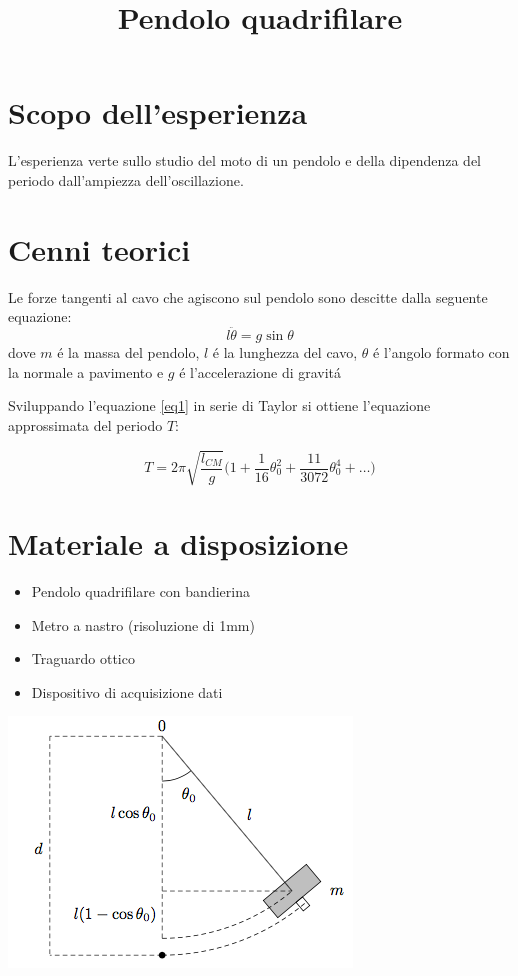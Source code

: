 \documentclass{article}
\begin{document}
\title{Pendolo quadrifilare}
\maketitle
\section{Scopo dell'esperienza}
L'esperienza verte sullo studio del moto di un pendolo e della dipendenza del periodo dall'ampiezza dell'oscillazione.
\section{Cenni teorici}
Le forze tangenti al cavo che agiscono sul pendolo sono descitte dalla seguente equazione:
\begin{equation}
\label{eq1}
l\ddot{\theta}=g\sin\theta 
\end{equation}
dove $m$ \'e la massa del pendolo, $l$ \'e la lunghezza del cavo, $\theta$ \'e l'angolo formato con la normale a pavimento e $g$ \'e l'accelerazione di gravit\'a\par
Sviluppando l'equazione \ref{eq1} in serie di Taylor si ottiene l'equazione approssimata del periodo $T$:

\begin{equation}
\label{eq2}
T=2\pi\sqrt{\frac{l_{CM}}{g}}\bigg(1+\frac{1}{16}\theta_{0}^2+\frac{11}{3072}\theta_{0}^4+\dots\bigg)
\end{equation}

\section{Materiale a disposizione}

\begin{itemize}
\item Pendolo quadrifilare con bandierina
\item Metro a nastro (risoluzione di 1mm)
\item Traguardo ottico
\item Dispositivo di acquisizione dati
\end{itemize}

\includegraphics[scale=0.5]{schema_pendolo}
\end{document}
